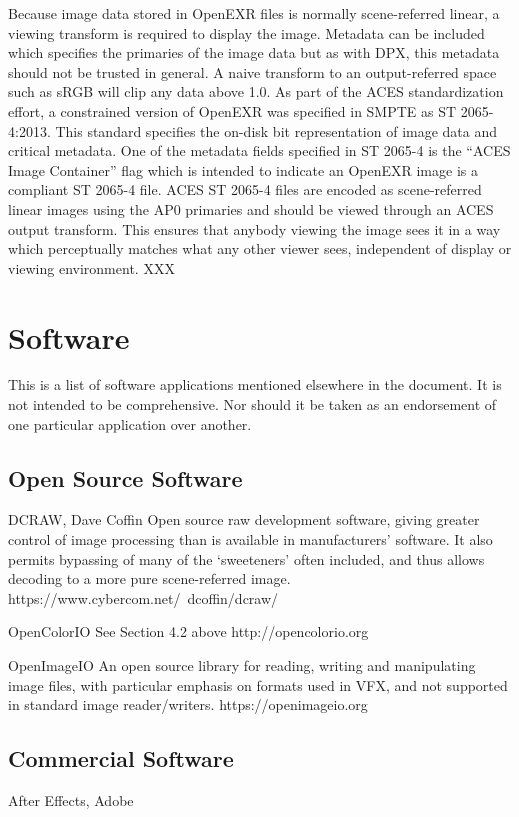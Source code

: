 Because image data stored in OpenEXR files is normally scene-referred linear, a viewing transform is required to display the image. Metadata can be included which specifies the primaries of the image data but as with DPX, this metadata should not be trusted in general. A naive transform to an output-referred space such as sRGB will clip any data above 1.0. As part of the ACES standardization effort, a constrained version of OpenEXR was specified in SMPTE as ST 2065-4:2013.  This standard specifies the on-disk bit representation of image data and critical metadata.  One of the metadata fields specified in ST 2065-4 is the “ACES Image Container” flag which is intended to indicate an OpenEXR image is a compliant ST 2065-4 file.  ACES ST 2065-4 files are encoded as scene-referred linear images using the AP0 primaries and should be viewed through an ACES output transform. This ensures that anybody viewing the image sees it in a way which perceptually matches what any other viewer sees, independent of display or viewing environment.
XXX

\section{Software}

This is a list of software applications mentioned elsewhere in the document. It is not intended to be comprehensive. Nor should it be taken as an endorsement of one particular application over another.

\subsection{Open Source Software}

DCRAW, Dave Coffin
Open source raw development software, giving greater control of image processing than is available in manufacturers’ software. It also permits bypassing of many of the ‘sweeteners’ often included, and thus allows decoding to a more pure scene-referred image. https://www.cybercom.net/~dcoffin/dcraw/

OpenColorIO
See Section 4.2 above
http://opencolorio.org

OpenImageIO
An open source library for reading, writing and manipulating image files, with particular emphasis on formats used in VFX, and not supported in standard image reader/writers. https://openimageio.org

\subsection{Commercial Software}
After Effects, Adobe

